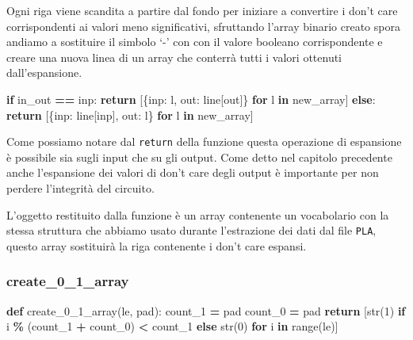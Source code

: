 \documentclass[
  italian,
]{book}
\newenvironment{Shaded}{\begin{snugshade}}{\end{snugshade}}
\newcommand{\BuiltInTok}[1]{#1}
\newcommand{\ControlFlowTok}[1]{\textcolor[rgb]{0.13,0.29,0.53}{\textbf{#1}}}
\newcommand{\DecValTok}[1]{\textcolor[rgb]{0.00,0.00,0.81}{#1}}
\newcommand{\KeywordTok}[1]{\textcolor[rgb]{0.13,0.29,0.53}{\textbf{#1}}}
\newcommand{\NormalTok}[1]{#1}
\newcommand{\OperatorTok}[1]{\textcolor[rgb]{0.81,0.36,0.00}{\textbf{#1}}}
\newcommand{\StringTok}[1]{\textcolor[rgb]{0.31,0.60,0.02}{#1}}
\begin{document}
Ogni riga viene scandita a partire dal fondo per iniziare a convertire i don't care corrispondenti ai valori meno significativi, sfruttando l'array binario creato spora andiamo a sostituire il simbolo `-' con con il valore booleano corrispondente e creare una nuova linea di un array che conterrà tutti i valori ottenuti dall'espansione.

\newpage

\begin{Shaded}
\begin{Highlighting}[]
\ControlFlowTok{if}\NormalTok{ in\_out }\OperatorTok{==} \StringTok{\textquotesingle{}inp\textquotesingle{}}\NormalTok{:}
  \ControlFlowTok{return}\NormalTok{ [\{}\StringTok{\textquotesingle{}inp\textquotesingle{}}\NormalTok{:  l, }\StringTok{\textquotesingle{}out\textquotesingle{}}\NormalTok{:  line[}\StringTok{\textquotesingle{}out\textquotesingle{}}\NormalTok{]\} }\ControlFlowTok{for}\NormalTok{ l }\KeywordTok{in}\NormalTok{ new\_array]}
\ControlFlowTok{else}\NormalTok{:}
  \ControlFlowTok{return}\NormalTok{ [\{}\StringTok{\textquotesingle{}inp\textquotesingle{}}\NormalTok{:  line[}\StringTok{\textquotesingle{}inp\textquotesingle{}}\NormalTok{], }\StringTok{\textquotesingle{}out\textquotesingle{}}\NormalTok{:  l\} }\ControlFlowTok{for}\NormalTok{ l }\KeywordTok{in}\NormalTok{ new\_array]}
\end{Highlighting}
\end{Shaded}

Come possiamo notare dal \texttt{return} della funzione questa operazione di espansione è possibile sia sugli input che su gli output. Come detto nel capitolo precedente anche l'espansione dei valori di don't care degli output è importante per non perdere l'integrità del circuito.

L'oggetto restituito dalla funzione è un array contenente un vocabolario con la stessa struttura che abbiamo usato durante l'estrazione dei dati dal file \texttt{PLA}, questo array sostituirà la riga contenente i don't care espansi.

\hypertarget{create_0_1_array}{%
\subsubsection{create\_0\_1\_array}\label{create_0_1_array}}

\begin{Shaded}
\begin{Highlighting}[]
\KeywordTok{def}\NormalTok{ create\_0\_1\_array(le, pad):}
\NormalTok{  count\_1 }\OperatorTok{=}\NormalTok{ pad}
\NormalTok{  count\_0 }\OperatorTok{=}\NormalTok{ pad}
  \ControlFlowTok{return}\NormalTok{ [}\BuiltInTok{str}\NormalTok{(}\DecValTok{1}\NormalTok{) }\ControlFlowTok{if}\NormalTok{ i }\OperatorTok{\%}\NormalTok{ (count\_1 }\OperatorTok{+}\NormalTok{ count\_0) }\OperatorTok{\textless{}}\NormalTok{ count\_1 }
    \ControlFlowTok{else} \BuiltInTok{str}\NormalTok{(}\DecValTok{0}\NormalTok{) }\ControlFlowTok{for}\NormalTok{ i }\KeywordTok{in} \BuiltInTok{range}\NormalTok{(le)]}
\end{Highlighting}
\end{Shaded}
\end{document}
